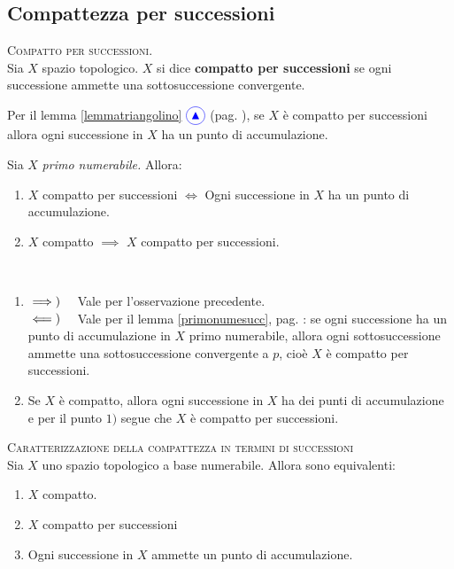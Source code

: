 \subsection{Compattezza per successioni}
\begin{define}\textsc{Compatto per successioni.}\\
Sia $X$ spazio topologico. $X$ si dice \textbf{compatto per successioni} se ogni successione ammette una sottosuccessione convergente.
\end{define}
\begin{observe}
Per il lemma \ref{lemmatriangolino} $\textcolor{blue}{\circled{{\large \blacktriangle}}}$ (pag. \pageref{lemmatriangolino}), se $X$ è compatto per successioni allora ogni successione in $X$ ha un punto di accumulazione.
\end{observe}
\begin{lemming}
	Sia $X$ \textit{primo numerabile.} Allora:
\begin{enumerate}
	\item $X$ compatto per successioni $\iff $ Ogni successione in $X$ ha un punto di accumulazione.
	\item $X$ compatto $\implies$ $X$ compatto per successioni.
\end{enumerate}
\vspace{-3mm}
\end{lemming}
\begin{demonstration}~{}
\begin{enumerate}[label=\Roman*]
\item $\implies)\quad$ Vale per l'osservazione precedente.\\
$\impliedby)\quad$ Vale per il lemma \ref{primonumesucc}, pag. \pageref{primonumesucc}: se ogni successione ha un punto di accumulazione in $X$ primo numerabile, allora ogni sottosuccessione ammette una sottosuccessione convergente a $p$, cioè $X$ è compatto per successioni.
\item Se $X$ è compatto, allora ogni successione in $X$ ha dei punti di accumulazione e per il punto $1)$ segue che $X$ è compatto per successioni.
\end{enumerate}
\vspace{-3mm}
\end{demonstration}
\begin{proposition}\textsc{Caratterizzazione della compattezza in termini di successioni}\\
	Sia $X$ uno spazio topologico a base numerabile. Allora sono equivalenti:
	\begin{enumerate}
		\item $X$ compatto.
		\item $X$ compatto per successioni
		\item Ogni successione in $X$ ammette un punto di accumulazione.
	\end{enumerate}
\vspace{-3mm}
\end{proposition}
